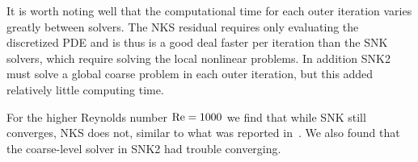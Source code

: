 It is worth noting well that the computational time for each outer iteration varies greatly between solvers. The NKS residual requires only evaluating the discretized PDE and is thus is a good deal faster per iteration than the SNK solvers, which require solving the local nonlinear problems. In addition SNK2 must solve a global coarse problem in each outer iteration, but this added relatively little computing time. 

For the higher Reynolds number $\text{Re} = 1000$ we find that while SNK still converges, NKS does not, similar to what was reported in~\cite{Cai2002}. We also found that the coarse-level solver in SNK2 had trouble converging. 


\begin{figure}
  \centering
\end{figure}
